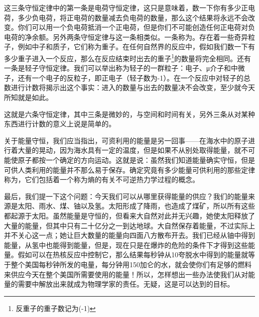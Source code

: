 这三条守恒定律中的第一条是电荷守恒定律，这只是意味着，数一下你有多少正电荷，多少负电荷，将正电荷的数量减去负电荷的数量，那么这个结果将永远不会改变。你们可以用一个负电荷抵消一个正电荷，但是你们不可能创造任何正电荷对负电荷的净余额。另外两条守恒定律与这一条相类似。一条称为。存在着一些奇异粒子，例如中子和质子，它们称为重子。在任何自然界的反应中，假如我们数一下有多少重子进入一个反应，那么在反应结束时出去的重子\footnote{反重子的重子数记为(-1)}的数量将完全相同。还有一条是轻子守恒定律。我们可以举出称为轻子的一群粒子：电子、μ介子和中微子，还有一个电子的反粒子，即正电子（轻子数为-1）。在一个反应中对轻子的总数进行计数将揭示出这个事实：进入的数量与出去的数量决不会改变，至少就今天所知就是如此。

这就是六条守恒定律，其中三条是微妙的，与空间和时间有关，另外三条从对某种东西进行计数的意义上说是简单的。

关于能量守恒，我们应当指出，可资利用的能量是另一回事——在海水中的原子进行着大量的晃动，因为海水具有一定的温度，但是如果不从别处取得能量，就不可能使原子都按一个确定的方向运动。这就是说：虽然我们知道能量确实守恒，但是可供人类利用的能量并不那么易于保存。确定究竟有多少能量可供利用的那些定律称为，它们包括着一个称为熵的有关不可逆热力学过程的概念。

最后，我们提一下这个问题：今天我们可以从哪里获得能量的供应？我们的能量来源是太阳、雨水、煤、铀以及氢。太阳形成了降雨，也造成了煤矿，所以所有这些都起源于太阳。虽然能量是守恒的，但看来大自然对此并无兴趣，她使太阳释放了大量的能量，但其中只有二十亿分之一到达地球。大自然保存着能量，不过实际上并不关心这一点；她让巨大数量的能量向四面八方散布开去。我们已经从铀中得到能量，从氢中也能得到能量，但是，现在只是在爆炸的危险的条件下才得到这些能量。假如可以在热核反应中控制它，那么结果每秒钟从10夸脱水中得到的能量就等于整个美国每秒钟所发的电量，每分钟用150加仑的水，就会使你们有足够的燃料来供应今天在整个美国所需要使用的能量！所以，怎样想出一些办法使我们从对能量的需要中解放出来就成为物理学家的责任。无疑，这是可以达到的目标。
